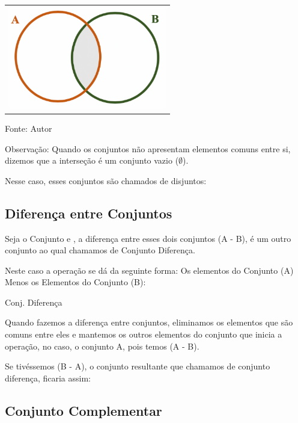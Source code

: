 \begin{multicols*}{2}
        	\begin{tabular}{@{}c@{}}
      		\includegraphics[height=45mm]{assets/Conjunto Intersecção.png}
    		\end{tabular}
    		
       Fonte: Autor
       
       Observação: Quando os conjuntos não apresentam elementos comuns entre si, dizemos que a interseção é um conjunto vazio ($\emptyset$).
       
       Nesse caso, esses conjuntos são chamados de disjuntos:
       
       
		\subsection{Diferença entre Conjuntos}       
       
		Seja o Conjunto  e , a diferença entre esses dois conjuntos (A - B), é um outro conjunto ao qual chamamos de Conjunto Diferença.
		
		Neste caso a operação se dá da seguinte forma: Os elementos do Conjunto (A) Menos os Elementos do Conjunto (B):
		
		Conj. Diferença 
		
		Quando fazemos a diferença entre conjuntos, eliminamos os elementos que são comuns entre eles e mantemos os outros elementos do conjunto que inicia a operação, no caso, o conjunto A, pois temos (A - B).
		
		Se tivéssemos (B - A), o conjunto resultante que chamamos de conjunto diferença, ficaria assim:
		
       
		\subsection{Conjunto Complementar}           
       

\end{multicols*}
